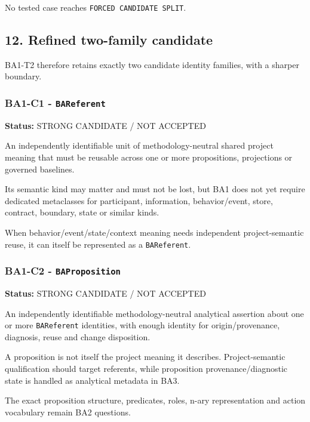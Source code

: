 \documentclass[
  10pt,
]{article}
\begin{document}
No tested case reaches \texttt{FORCED\ CANDIDATE\ SPLIT}.

\subsection{12. Refined two-family
candidate}\label{refined-two-family-candidate}

BA1-T2 therefore retains exactly two candidate identity families, with a
sharper boundary.

\subsubsection{\texorpdfstring{BA1-C1 -
\texttt{BAReferent}}{BA1-C1 - BAReferent}}\label{ba1-c1---bareferent}

\textbf{Status:} STRONG CANDIDATE / NOT ACCEPTED

An independently identifiable unit of methodology-neutral shared project
meaning that must be reusable across one or more propositions,
projections or governed baselines.

Its semantic kind may matter and must not be lost, but BA1 does not yet
require dedicated metaclasses for participant, information,
behavior/event, store, contract, boundary, state or similar kinds.

When behavior/event/state/context meaning needs independent
project-semantic reuse, it can itself be represented as a
\texttt{BAReferent}.

\subsubsection{\texorpdfstring{BA1-C2 -
\texttt{BAProposition}}{BA1-C2 - BAProposition}}\label{ba1-c2---baproposition}

\textbf{Status:} STRONG CANDIDATE / NOT ACCEPTED

An independently identifiable methodology-neutral analytical assertion
about one or more \texttt{BAReferent} identities, with enough identity
for origin/provenance, diagnosis, reuse and change disposition.

A proposition is not itself the project meaning it describes.
Project-semantic qualification should target referents, while
proposition provenance/diagnostic state is handled as analytical
metadata in BA3.

The exact proposition structure, predicates, roles, n-ary representation
and action vocabulary remain BA2 questions.
\end{document}
